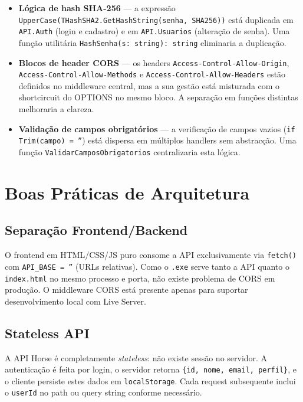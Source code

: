 \documentclass[12pt,a4paper]{article}
\begin{document}
\begin{itemize}
  \item \textbf{Lógica de hash SHA-256} — a expressão \texttt{UpperCase(THashSHA2.GetHashString(senha, SHA256))} está duplicada em \texttt{API.Auth} (login e cadastro) e em \texttt{API.Usuarios} (alteração de senha). Uma função utilitária \texttt{HashSenha(s: string): string} eliminaria a duplicação.

  \item \textbf{Blocos de header CORS} — os headers \texttt{Access-Control-Allow-Origin}, \texttt{Access-Control-Allow-Methods} e \texttt{Access-Control-Allow-Headers} estão definidos no middleware central, mas a sua gestão está misturada com o shortcircuit do OPTIONS no mesmo bloco. A separação em funções distintas melhoraria a clareza.

  \item \textbf{Validação de campos obrigatórios} — a verificação de campos vazios (\texttt{if Trim(campo) = ''}) está dispersa em múltiplos handlers sem abstracção. Uma função \texttt{ValidarCamposObrigatorios} centralizaria esta lógica.
\end{itemize}

\newpage
\section{Boas Práticas de Arquitetura}

\subsection{Separação Frontend/Backend}

O frontend em HTML/CSS/JS puro consome a API exclusivamente via \texttt{fetch()} com \texttt{API\_BASE = ''} (URLs relativas). Como o \texttt{.exe} serve tanto a API quanto o \texttt{index.html} no mesmo processo e porta, não existe problema de CORS em produção. O middleware CORS está presente apenas para suportar desenvolvimento local com Live Server.

\subsection{Stateless API}

A API Horse é completamente \textit{stateless}: não existe sessão no servidor. A autenticação é feita por login, o servidor retorna \texttt{\{id, nome, email, perfil\}}, e o cliente persiste estes dados em \texttt{localStorage}. Cada request subsequente inclui o \texttt{userId} no path ou query string conforme necessário.
\end{document}
